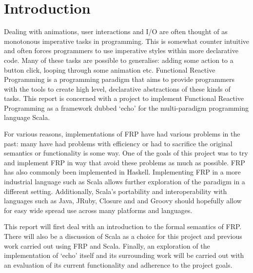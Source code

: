 \chapter{Introduction}

  Dealing with animations, user interactions and I/O are often thought of as monotonous imperative tasks
  in programming. This is somewhat counter intuitive and often forces programmers to use imperative
  styles within more declarative code. Many of these tasks are possible to generalise: adding
  some action to a button click, looping through some animation etc. Functional Reactive Programming
  is a programming paradigm that aims to provide programmers with the tools to create high level,
  declarative abstractions of these kinds of tasks. This report is concerned with a project to
  implement Functional Reactive Programming as a framework dubbed `echo' \cite{Stott} for the multi-paradigm programming language
  Scala.

  For various reasons, implementations of FRP have had various problems in the past: many have had problems
  with efficiency or had to sacrifice the original semantics or functionality is some way. One of the goals
  of this project was to try and implement FRP in way that avoid these problems as much as possible. FRP
  has also commonly been implemented in Haskell. Implementing FRP in a more industrial language such as Scala allows
  further exploration of the paradigm in a different setting. Additionally, Scala's portability and interoperability with
  languages such as Java, JRuby, Closure and and Groovy should hopefully allow for easy wide spread use across many platforms and languages. 

  This report will first deal with an introduction to the formal semantics of FRP. There will also be a discussion of Scala as a 
  choice for this project and previous work carried out using FRP and Scala.
  Finally, an exploration of the implementation of `echo' itself and its surrounding work will be carried out with an
  evaluation of its current functionality and adherence to the project goals.